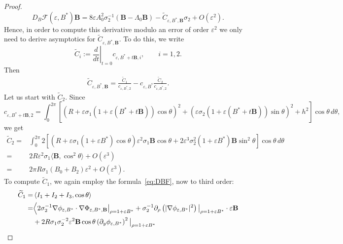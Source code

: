 \documentclass[12pt,reqno]{amsart}
\numberwithin{equation}{section}
\theoremstyle{definition}
\theoremstyle{remark}
\begin{document}
\begin{proof}
\[
D_B\mathcal{F}(\varepsilon,B^*) \textbf{B}
= 8\varepsilon A_0^2\sigma_2^{-1} (  \textbf{B} - \Lambda_0  \textbf{B})
- \widetilde C_{\varepsilon,B^*,\textbf{B}} \sigma_2 + O(\varepsilon^2) .
\]
Hence, in order to compute this derivative modulo an error of order $\varepsilon^2$ we only need to derive asymptotics for $ \widetilde C_{\varepsilon,B^*,\textbf{B}}$.
To do this, we write
$$\widetilde C_i:=\left.\frac{d}{dt}\right|_{t=0}c_{\varepsilon,B^*+t \textbf{B}, i}, \qquad i=1,2.$$  Then
\begin{align*}
\widetilde C_{\varepsilon,B^*,\textbf{B}}=\frac{\widetilde C_1}{c_{\varepsilon,B^*,2}}-c_{\varepsilon,B^*}\frac{\widetilde C_2}{c_{\varepsilon,B^*,2}}.
\end{align*}
Let us start with $\widetilde C_2$. Since
\begin{equation*} 
c_{\varepsilon,B^*+t \textbf{B},2}
=\int_0^{2\pi}\left [(R+\varepsilon\sigma_1(1+\varepsilon(B^*+t  \textbf{B}))\cos\theta)^2 + (\varepsilon\sigma_2(1+\varepsilon(B^*+t  \textbf{B}))\sin\theta)^2+h^2\right ]\cos\theta\, d\theta,
\end{equation*}
we get
\begin{equation*}%
\begin{split}
\widetilde C_2=&\int_0^{2\pi}2\left[\left (R+\varepsilon\sigma_1(1+\varepsilon B^*)\cos\theta\right )\varepsilon^2\sigma_1  \textbf{B}\cos\theta
+2\varepsilon^3\sigma_2^2(1+\varepsilon B^*)  \textbf{B}\sin^2\theta\right]
\cos\theta\, d\theta \\
=&2R\varepsilon^2\sigma_1\langle  \textbf{B}, \cos^2\theta\rangle+O(\varepsilon^3)\\
=&2\pi R\sigma_1(B_0+B_2)\varepsilon^2+O(\varepsilon^3).
\end{split}
\end{equation*}
To compute $\widetilde C_1$, we again employ the formula~\eqref{eq:DBF}, now to third order:
\begin{align}\label{eq: C_1}
\widetilde C_1 =	&\left\langle I_1+I_2+I_3, \cos \theta\right\rangle\notag\\
		=&\Big\langle 2\sigma_2^{-1}\nabla\phi_{\varepsilon,B^*}\cdot\nabla\Phi_{\varepsilon,B^*,
			\textbf{B}}\big|_{\rho=1+\varepsilon B^*}
		+\sigma_2^{-1}\partial_\rho\left(|\nabla\phi_{\varepsilon,B^*}|^2\right)\big|_{\rho=1+\varepsilon B^*}\cdot\varepsilon  \textbf{B} \notag\\
		& +2 R \sigma_1\sigma_2^{-2}  \varepsilon^2 \textbf{B} \cos \theta\left(\partial_y \phi_{\varepsilon, B^*}\right)^2\big|_{\rho=1+ \varepsilon B^*} \notag\\

\end{align}
\end{proof}
\end{document}
